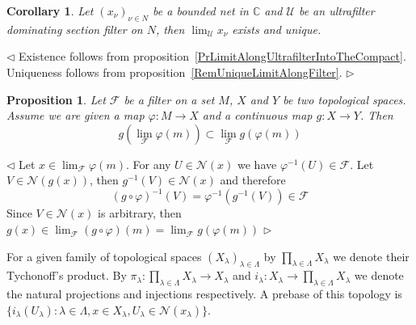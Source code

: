 \documentclass[12pt]{article}
\newtheorem{proposition}[theorem]{Proposition}
\newtheorem{corollary}[theorem]{Corollary}
\newenvironment{proof}{\par $\triangleleft$}{$\triangleright$}
\begin{document}
\begin{corollary}\label{PrLimitOfASequenceAlongUltrafilter} Let
    ${(x_\nu)}_{\nu\in N}$ be a bounded net in $\mathbb{C}$ and $\mathcal{U}$ be
    an ultrafilter dominating section filter on $N$, then
    $\lim_{\mathcal{U}}x_\nu$ exists and unique.
\end{corollary}
\begin{proof} Existence follows from
    proposition~\ref{PrLimitAlongUltrafilterIntoTheCompact}. Uniqueness follows
    from proposition~\ref{RemUniqueLimitAlongFilter}.
\end{proof}


\begin{proposition}\label{PrFiltersUnderContinuousFunctions} Let $\mathcal{F}$
    be a filter on a set $M$, $X$ and $Y$ be two topological spaces. Assume we
    are given a map $\varphi:M\to X$ and a continuous map $g: X\to Y$. Then
    $$
        g\left(\lim_{\mathcal{F}}\varphi(m)\right)
        \subset\lim_{\mathcal{F}}g(\varphi(m))
    $$
\end{proposition}
\begin{proof} Let $x\in\lim_{\mathcal{F}}\varphi(m)$. For any
    $U\in\mathcal{N}(x)$ we have $\varphi^{-1}(U)\in\mathcal{F}$. Let
    $V\in\mathcal{N}(g(x))$, then $g^{-1}(V)\in\mathcal{N}(x)$ and therefore
    $$
        {(g\circ\varphi)}^{-1}(V)=\varphi^{-1}(g^{-1}(V))\in\mathcal{F}
    $$
    Since $V\in\mathcal{N}(x)$ is arbitrary, then
    $g(x)\in\lim_{\mathcal{F}}(g\circ\varphi)(m)=
        \lim_{\mathcal{F}}g(\varphi(m))$
\end{proof}

For a given family of topological spaces ${(X_\lambda)}_{\lambda\in \Lambda}$ by
$\prod_{\lambda\in \Lambda}X_\lambda$ we denote their Tychonoff's product. By
$\pi_\lambda:\prod_{\lambda\in \Lambda}X_\lambda\to X_\lambda$ and
$i_\lambda:X_\lambda\to \prod_{\lambda\in \Lambda}X_\lambda$ we denote the
natural projections and injections respectively. A prebase of this topology is
$\{i_{\lambda}(U_\lambda):\lambda\in\Lambda, x\in X_\lambda, U_\lambda\in
    \mathcal{N}(x_\lambda)\}$.
\end{document}
